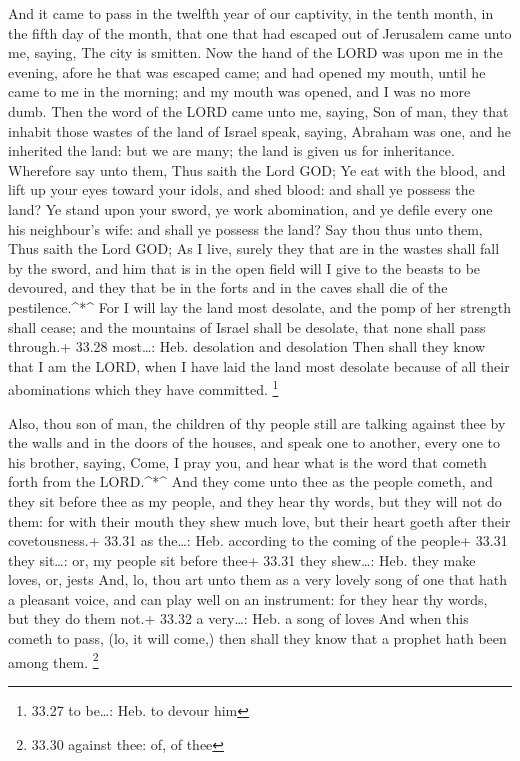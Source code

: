  And it came to pass in the twelfth year of our captivity,
in the tenth month, in the fifth day of the month, that one that had
escaped out of Jerusalem came unto me, saying, The city is smitten.
 Now the hand of the LORD was upon me in the evening, afore
he that was escaped came; and had opened my mouth, until he came to me
in the morning; and my mouth was opened, and I was no more dumb.
 Then the word of the LORD came unto me, saying,
 Son of man, they that inhabit those wastes of the land of
Israel speak, saying, Abraham was one, and he inherited the land: but we
are many; the land is given us for inheritance.  Wherefore
say unto them, Thus saith the Lord GOD; Ye eat with the blood, and lift
up your eyes toward your idols, and shed blood: and shall ye possess the
land?  Ye stand upon your sword, ye work abomination, and
ye defile every one his neighbour's wife: and shall ye possess the land?
 Say thou thus unto them, Thus saith the Lord GOD; As I
live, surely they that are in the wastes shall fall by the sword, and
him that is in the open field will I give to the beasts to be devoured,
and they that be in the forts and in the caves shall die of the
pestilence.\^{}*\^{}  For I will lay the land most
desolate, and the pomp of her strength shall cease; and the mountains of
Israel shall be desolate, that none shall pass through.+ 33.28
most\ldots: Heb. desolation and desolation  Then shall they
know that I am the LORD, when I have laid the land most desolate because
of all their abominations which they have committed. \footnote{33.27 to
  be\ldots: Heb. to devour him}

 Also, thou son of man, the children of thy people still
are talking against thee by the walls and in the doors of the houses,
and speak one to another, every one to his brother, saying, Come, I pray
you, and hear what is the word that cometh forth from the LORD.\^{}*\^{}
 And they come unto thee as the people cometh, and they sit
before thee as my people, and they hear thy words, but they will not do
them: for with their mouth they shew much love, but their heart goeth
after their covetousness.+ 33.31 as the\ldots: Heb. according to the
coming of the people+ 33.31 they sit\ldots: or, my people sit before
thee+ 33.31 they shew\ldots: Heb. they make loves, or, jests
 And, lo, thou art unto them as a very lovely song of one
that hath a pleasant voice, and can play well on an instrument: for they
hear thy words, but they do them not.+ 33.32 a very\ldots: Heb. a song
of loves  And when this cometh to pass, (lo, it will come,)
then shall they know that a prophet hath been among them. \footnote{33.30
  against thee: of, of thee}

